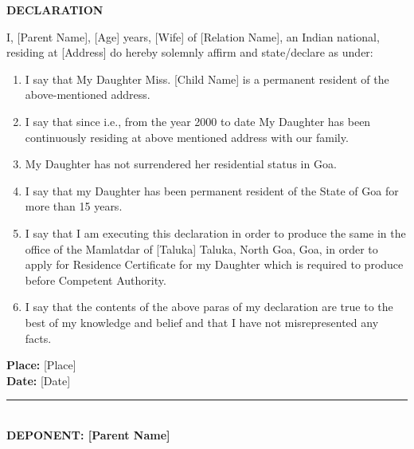\documentclass[12pt, a4paper]{article}
\begin{document}
\begin{flushleft}
\end{flushleft}

\begin{center}
    \textbf{\Large DECLARATION}
\end{center}

I, [Parent Name], [Age] years, [Wife] of [Relation Name], an Indian national, residing at [Address] do hereby solemnly affirm and state/declare as under:

\begin{enumerate}
    \item I say that My Daughter Miss. [Child Name] is a permanent resident of the above-mentioned address.
    \item I say that since i.e., from the year 2000 to date My Daughter has been continuously residing at above mentioned address with our family.
    \item My Daughter has not surrendered her residential status in Goa.
    \item I say that my Daughter has been permanent resident of the State of Goa for more than 15 years.
    \item I say that I am executing this declaration in order to produce the same in the office of the Mamlatdar of [Taluka] Taluka, North Goa, Goa, in order to apply for Residence Certificate for my Daughter which is required to produce before Competent Authority.
    \item I say that the contents of the above paras of my declaration are true to the best of my knowledge and belief and that I have not misrepresented any facts.
\end{enumerate}

\vspace{0.35cm}
\noindent \textbf{Place:} [Place] \\
\textbf{Date:} [Date]

\vspace{0.4cm}
\begin{flushleft}
    \rule{6cm}{0.4pt} \\
    \textbf{DEPONENT: [Parent Name]}
\end{flushleft}
\end{document}
